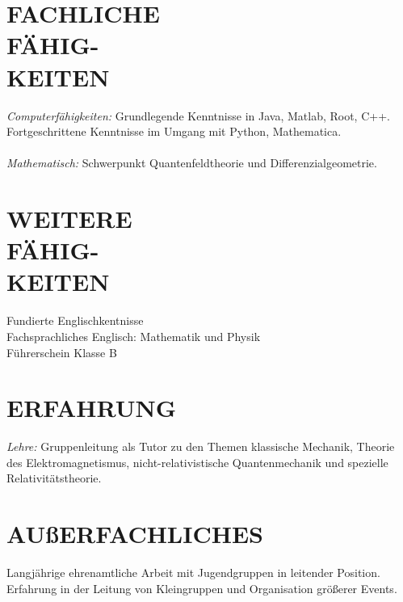 \documentclass[margin,12pt]{res} %
\begin{document}
\begin{resume}
\section{FACHLICHE \\ FÄHIG-\\KEITEN} 

{\sl Computerfähigkeiten:} 
Grundlegende Kenntnisse in Java, Mat\-lab, Root, C++. \\
Fortgeschrittene Kenntnisse im Umgang mit Python, Ma\-the\-ma\-ti\-ca. 
\\\\
{\sl Mathematisch:}  
Schwerpunkt Quantenfeldtheorie und Differenzialgeometrie.

\section{WEITERE \\ FÄHIG-\\KEITEN} 
Fundierte Englischkentnisse \\
Fachsprachliches Englisch: Mathematik und Physik \\
Führerschein Klasse B

 
\section{ERFAHRUNG}

{\sl Lehre:} Gruppenleitung als Tutor zu den Themen klassische Me\-cha\-nik, Theorie des Elektromagnetismus, nicht-relativistische Quantenmechanik und spezielle Relativitätstheorie.

\section{AUßER\-FACHLICHES }

Langjährige ehrenamtliche Arbeit mit Jugendgruppen in leitender Position. Erfahrung in der Leitung von Kleingruppen und Organisation größerer Events.


\end{resume}
\end{document}
